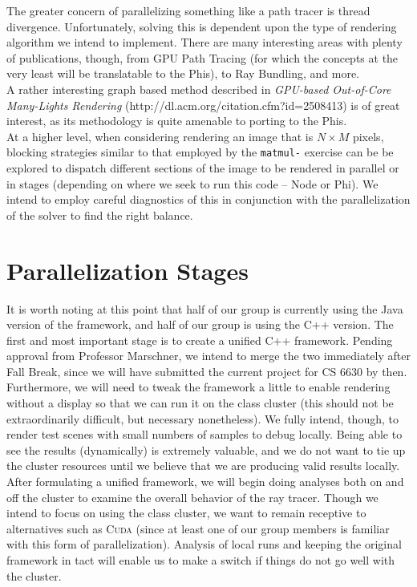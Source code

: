 \documentclass[11pt]{article}
\begin{document}
The greater concern of parallelizing something like a path tracer is thread divergence.  Unfortunately, solving this is dependent upon the type of rendering algorithm we intend to implement.  There are many interesting areas with plenty of publications, though, from GPU Path Tracing (for which the concepts at the very least will be translatable to the Phis), to Ray Bundling, and more.\\

A rather interesting graph based method described in \emph{GPU-based Out-of-Core Many-Lights Rendering} (http://dl.acm.org/citation.cfm?id=2508413) is of great interest, as its methodology is quite amenable to porting to the Phis.\\

At a higher level, when considering rendering an image that is $N \times M$ pixels, blocking strategies similar to that employed by the \texttt{matmul-} exercise can be be explored to dispatch different sections of the image to be rendered in parallel or in stages (depending on where we seek to run this code -- Node or Phi).  We intend to employ careful diagnostics of this in conjunction with the parallelization of the solver to find the right balance.\\

\section{Parallelization Stages}

It is worth noting at this point that half of our group is currently using the Java version of the framework, and half of our group is using the C++ version.  The first and most important stage is to create a unified C++ framework.  Pending approval from Professor Marschner, we intend to merge the two immediately after Fall Break, since we will have submitted the current project for CS 6630 by then.  Furthermore, we will need to tweak the framework a little to enable rendering without a display so that we can run it on the class cluster (this should not be extraordinarily difficult, but necessary nonetheless).  We fully intend, though, to render test scenes with small numbers of samples to debug locally.  Being able to see the results (dynamically) is extremely valuable, and we do not want to tie up the cluster resources until we believe that we are producing valid results locally.\\

After formulating a unified framework, we will begin doing analyses both on and off the cluster to examine the overall behavior of the ray tracer.  Though we intend to focus on using the class cluster, we want to remain receptive to alternatives such as \textsc{Cuda} (since at least one of our group members is familiar with this form of parallelization).  Analysis of local runs and keeping the original framework in tact will enable us to make a switch if things do not go well with the cluster.\\
\end{document}
